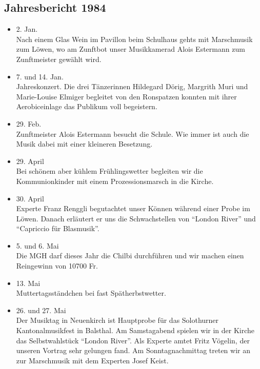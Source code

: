 \subsection{Jahresbericht 1984}

\begin{history}


    \begin{itemize}

        \item[]2. Jan.\\
        Nach einem Glas Wein im Pavillon beim Schulhaus gehts mit Marschmusik
        zum Löwen, wo am Zunftbot unser Musikkamerad Alois Estermann zum
        Zunftmeister gewählt wird.

        \item[]7. und 14. Jan.\\
        Jahreskonzert. Die drei Tänzerinnen Hildegard Dörig, Margrith Muri und
        Marie-Louise Elmiger begleitet von den Ronspatzen konnten mit ihrer
        Aerobiceinlage das Publikum voll begeistern.

        \item[]29. Feb.\\
        Zunftmeister Alois Estermann besucht die Schule. Wie immer ist auch die
        Musik dabei mit einer kleineren Besetzung.

        \item[]29. April\\
        Bei schönem aber kühlem Frühlingswetter begleiten wir die
        Kommunionkinder mit einem Prozessionsmarsch in die Kirche.

        \item[]30. April\\
        Experte Franz Renggli begutachtet unser Können während einer Probe im
        Löwen. Danach erläutert er uns die Schwachstellen von \enquote{London
            River} und \enquote{Capriccio für Blasmusik}.

        \item[]5. und 6. Mai\\
        Die MGH darf dieses Jahr die Chilbi durchführen und wir machen einen
        Reingewinn von 10700 Fr.

        \item[]13. Mai\\
        Muttertagsständchen bei fast Spätherbstwetter.

        \item[]26. und 27. Mai\\
        Der Musiktag in Neuenkirch ist Hauptprobe für das Solothurner
        Kantonalmusikfest in Balsthal. Am Samstagabend spielen wir in der Kirche
        das Selbstwahlstück \enquote{London River}. Als Experte amtet Fritz
        Vögelin, der unseren Vortrag sehr gelungen fand. Am Sonntagnachmittag
        treten wir an zur Marschmusik mit dem Experten Josef Keist.


\end{itemize}
\end{history}
